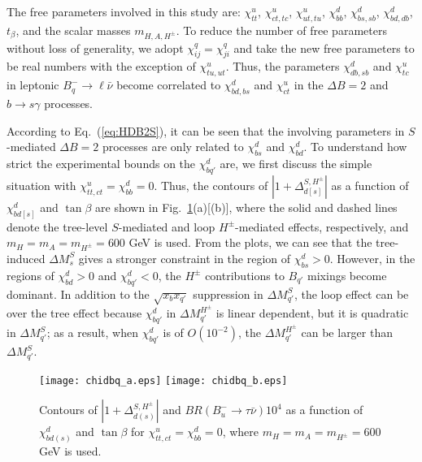 \documentclass[prd,preprint,superscriptaddress,amsmath,amssymb]{revtex4}
\begin{document}
  The free parameters involved in this study are: $\chi^u_{tt}$, $\chi^u_{ct,tc}$, $\chi^{u}_{ut,tu}$, $\chi^d_{bb}$, $\chi^d_{bs,sb}$,  $\chi^d_{bd,db}$, $t_\beta$, and the scalar masses $m_{H,A,H^\pm}$.  To reduce the number of free parameters without loss of generality, we adopt $\chi^{q}_{ij}=\chi^q_{ji}$ and take the new free parameters to be real numbers with the exception of $\chi^u_{tu,ut}$.  Thus, the parameters $\chi^d_{db,sb}$ and $\chi^u_{tc}$ in leptonic $B^-_q \to \ell \bar \nu$ become correlated to $\chi^d_{bd,bs}$ and $\chi^u_{ct}$ in the $\Delta B=2$ and $b\to s \gamma$ processes.  
 
  According to Eq.~(\ref{eq:HDB2S}), it can be seen that the involving parameters in $S$-mediated $\Delta B=2$ processes are only related to $\chi^d_{bs}$ and $\chi^d_{bd}$.  To understand how strict the experimental bounds on the  $\chi^d_{bq'}$ are,  we first discuss the simple situation with $\chi^u_{tt,ct}=\chi^d_{bb}=0$.  Thus, the  contours of  $|1+\Delta^{S,H^\pm}_{d[s]}|$   as a function of $\chi^{d}_{bd[s]}$ and $\tan\beta$ are shown in Fig.~\ref{fig:chidbq}(a)[(b)], where the solid and dashed lines denote the tree-level $S$-mediated and loop $H^\pm$-mediated effects, respectively, and $m_H=m_A=m_{H^\pm}=600$ GeV is used.  From the plots, we can see that the tree-induced $\Delta M^S_{s}$ gives a  stronger constraint  in the region of $\chi^d_{bs}>0$. However, in the regions of $\chi^d_{bd}>0$ and $\chi^d_{bq'}<0$, the $H^\pm$ contributions to $B_{q'}$ mixings become dominant. In addition to the $\sqrt{x_b x_{q'}}$ suppression in $\Delta M^S_{q'}$, the loop effect can be over the tree effect because $\chi^d_{bq'}$ in $\Delta M^{H^\pm}_{q'}$ is linear dependent, but it is quadratic  in $\Delta M^S_{q'}$; as a result, when $\chi^d_{bq'}$ is of $O(10^{-2})$, the $\Delta M^{H^\pm}_{q'}$ can be larger than $\Delta M^{S}_{q'}$.  
  
\begin{figure}[phtb]
\texttt{[image: chidbq\_a.eps]}
\texttt{[image: chidbq\_b.eps]}
\caption{  Contours of $|1+\Delta^{S,H^\pm}_{d(s)}|$  and $BR(B^-_u \to \tau \bar\nu)10^{4}$ as a function of $\chi^d_{bd(s)}$ and $\tan\beta$ for $\chi^u_{tt,ct}=\chi^d_{bb}=0$, where $m_{H}=m_{A}=m_{H^\pm}=600$ GeV is used.}
\label{fig:chidbq}
\end{figure} 
\end{document}
